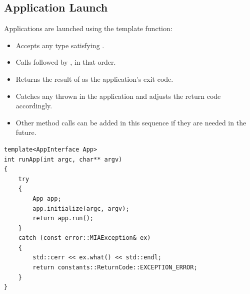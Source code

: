 \subsection{Application Launch}

Applications are launched using the  template function:
\begin{itemize}\itemsep0em
	\item Accepts any type satisfying .
	\item Calls  followed by , in that order.
	\item Returns the result of  as the application's exit code.
	\item Catches any  thrown in the application and adjusts the return code accordingly.
	\item Other method calls can be added in this sequence if they are needed in the future.
\end{itemize}
\begin{lstlisting}[style=cppstyle]
template<AppInterface App>
int runApp(int argc, char** argv)
{
    try
	{
		App app;
		app.initialize(argc, argv);
		return app.run();
	}
	catch (const error::MIAException& ex)
	{
		std::cerr << ex.what() << std::endl;
		return constants::ReturnCode::EXCEPTION_ERROR;
	}
}
\end{lstlisting}

